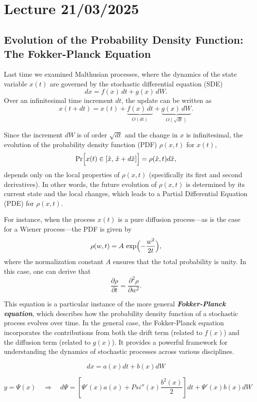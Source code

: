 \newpage

\chapter{Lecture 21/03/2025}

\section{Evolution of the Probability Density Function: The Fokker-Planck Equation}

Last time we examined Malthusian processes, where the dynamics of the state variable $x(t)$ are governed by the stochastic differential equation (SDE)
$$
dx = f(x)\,dt + g(x)\,dW.
$$
Over an infinitesimal time increment $dt$, the update can be written as
$$
x(t+dt) = x(t) + \underbrace{f(x)\,dt}_{O(dt)} + \underbrace{g(x)\,dW}_{O(\sqrt{dt})}.
$$

Since the increment $dW$ is of order $\sqrt{dt}$ and the change in $x$ is infinitesimal, the evolution of the probability density function (PDF) $\rho(x,t)$ for $x(t)$,
$$
\Pr\Bigl[x(t) \in [\hat{x},\,\hat{x}+d\hat{x}]\Bigr] = \rho(\hat{x},t)d\hat{x},
$$
depends only on the local properties of $\rho(x,t)$ (specifically its first and second derivatives). In other words, the future evolution of $\rho(x,t)$ is determined by its current state and the local changes, which leads to a Partial Differential Equation (PDE) for $\rho(x,t)$.

For instance, when the process $x(t)$ is a pure diffusion process—as is the case for a Wiener process—the PDF is given by
$$
\rho(w,t) = A\,\exp\Bigl(-\frac{w^2}{2t}\Bigr),
$$
where the normalization constant $A$ ensures that the total probability is unity. In this case, one can derive that
$$
\frac{\partial \rho}{\partial t} = \frac{\partial^2 \rho}{\partial w^2}.
$$

This equation is a particular instance of the more general \textbf{\textit{Fokker-Planck equation}}, which describes how the probability density function of a stochastic process evolves over time. In the general case, the Fokker-Planck equation incorporates the contributions from both the drift term (related to $f(x)$) and the diffusion term (related to $g(x)$). It provides a powerful framework for understanding the dynamics of stochastic processes across various disciplines.

\newpage

$$
dx = a(x) dt + b(x) dW
$$

$$
y = \Psi(x) \quad \Rightarrow \quad d\Psi = [\Psi'(x) a(x) + Psi''(x) \dfrac{b^2(x)}{2}] dt + \Psi'(x) b(x) dW
$$

